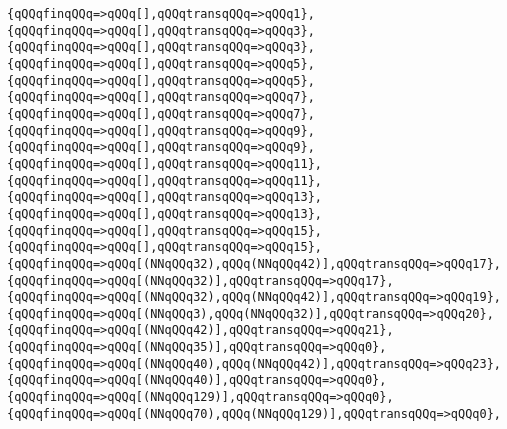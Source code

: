\verb|{qQQqfinqQQq=>qQQq[],qQQqtransqQQq=>qQQq1},|\newline
\verb|{qQQqfinqQQq=>qQQq[],qQQqtransqQQq=>qQQq3},|\newline
\verb|{qQQqfinqQQq=>qQQq[],qQQqtransqQQq=>qQQq3},|\newline
\verb|{qQQqfinqQQq=>qQQq[],qQQqtransqQQq=>qQQq5},|\newline
\verb|{qQQqfinqQQq=>qQQq[],qQQqtransqQQq=>qQQq5},|\newline
\verb|{qQQqfinqQQq=>qQQq[],qQQqtransqQQq=>qQQq7},|\newline
\verb|{qQQqfinqQQq=>qQQq[],qQQqtransqQQq=>qQQq7},|\newline
\verb|{qQQqfinqQQq=>qQQq[],qQQqtransqQQq=>qQQq9},|\newline
\verb|{qQQqfinqQQq=>qQQq[],qQQqtransqQQq=>qQQq9},|\newline
\verb|{qQQqfinqQQq=>qQQq[],qQQqtransqQQq=>qQQq11},|\newline
\verb|{qQQqfinqQQq=>qQQq[],qQQqtransqQQq=>qQQq11},|\newline
\verb|{qQQqfinqQQq=>qQQq[],qQQqtransqQQq=>qQQq13},|\newline
\verb|{qQQqfinqQQq=>qQQq[],qQQqtransqQQq=>qQQq13},|\newline
\verb|{qQQqfinqQQq=>qQQq[],qQQqtransqQQq=>qQQq15},|\newline
\verb|{qQQqfinqQQq=>qQQq[],qQQqtransqQQq=>qQQq15},|\newline
\verb|{qQQqfinqQQq=>qQQq[(NNqQQq32),qQQq(NNqQQq42)],qQQqtransqQQq=>qQQq17},|\newline
\verb|{qQQqfinqQQq=>qQQq[(NNqQQq32)],qQQqtransqQQq=>qQQq17},|\newline
\verb|{qQQqfinqQQq=>qQQq[(NNqQQq32),qQQq(NNqQQq42)],qQQqtransqQQq=>qQQq19},|\newline
\verb|{qQQqfinqQQq=>qQQq[(NNqQQq3),qQQq(NNqQQq32)],qQQqtransqQQq=>qQQq20},|\newline
\verb|{qQQqfinqQQq=>qQQq[(NNqQQq42)],qQQqtransqQQq=>qQQq21},|\newline
\verb|{qQQqfinqQQq=>qQQq[(NNqQQq35)],qQQqtransqQQq=>qQQq0},|\newline
\verb|{qQQqfinqQQq=>qQQq[(NNqQQq40),qQQq(NNqQQq42)],qQQqtransqQQq=>qQQq23},|\newline
\verb|{qQQqfinqQQq=>qQQq[(NNqQQq40)],qQQqtransqQQq=>qQQq0},|\newline
\verb|{qQQqfinqQQq=>qQQq[(NNqQQq129)],qQQqtransqQQq=>qQQq0},|\newline
\verb|{qQQqfinqQQq=>qQQq[(NNqQQq70),qQQq(NNqQQq129)],qQQqtransqQQq=>qQQq0},|\newline
